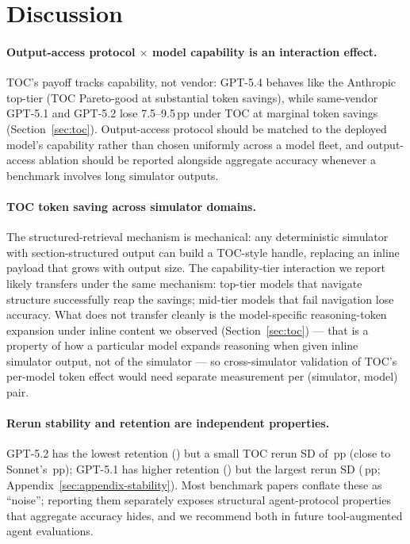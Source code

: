 \documentclass{article}
\begin{document}
\section{Discussion}

\paragraph{Output-access protocol $\times$ model capability is an interaction effect.}
TOC's payoff tracks capability, not vendor: GPT-5.4 behaves like the Anthropic top-tier (TOC Pareto-good at substantial token savings), while same-vendor GPT-5.1 and GPT-5.2 lose 7.5--9.5\,pp under TOC at marginal token savings (Section~\ref{sec:toc}). Output-access protocol should be matched to the deployed model's capability rather than chosen uniformly across a model fleet, and output-access ablation should be reported alongside aggregate accuracy whenever a benchmark involves long simulator outputs.

\paragraph{TOC token saving across simulator domains.}
The structured-retrieval mechanism is mechanical: any deterministic simulator with section-structured output can build a TOC-style handle, replacing an inline payload that grows with output size. The capability-tier interaction we report likely transfers under the same mechanism: top-tier models that navigate structure successfully reap the savings; mid-tier models that fail navigation lose accuracy. What does not transfer cleanly is the model-specific reasoning-token expansion under inline content we observed (Section~\ref{sec:toc}) --- that is a property of how a particular model expands reasoning when given inline simulator output, not of the simulator --- so cross-simulator validation of TOC's per-model token effect would need separate measurement per (simulator, model) pair.

\paragraph{Rerun stability and retention are independent properties.}
GPT-5.2 has the lowest retention (\GPTFiveTwoRetention) but a small TOC rerun SD of \GPTFiveTwoTOCRerunSD\,pp (close to Sonnet's \SonnetTOCRerunSD\,pp); GPT-5.1 has higher retention (\GPTFiveOneRetention) but the largest rerun SD (\GPTFiveOneTOCRerunSD\,pp; Appendix~\ref{sec:appendix-stability}). Most benchmark papers conflate these as ``noise''; reporting them separately exposes structural agent-protocol properties that aggregate accuracy hides, and we recommend both in future tool-augmented agent evaluations.
\end{document}
